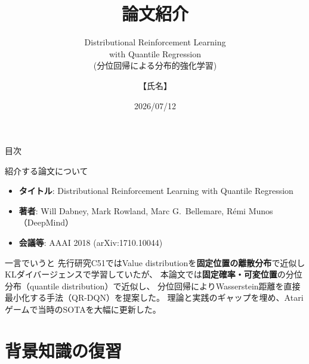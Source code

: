 \documentclass[aspectratio=169, dvipdfmx, 11pt]{beamer}
\title[論文紹介]{論文紹介}
\subtitle{Distributional Reinforcement Learning\\with Quantile Regression\\{\small (分位回帰による分布的強化学習)}}
\author{【氏名】}
\institute{【研究室名】 \quad 指導教員：【指導教員名】}
\date{2026/07/12}
\begin{document}
\maketitle

\begin{frame}{目次}
  \tableofcontents
\end{frame}

\begin{frame}{紹介する論文について}
  \begin{itemize}
    \item \textbf{タイトル}: Distributional Reinforcement Learning with Quantile Regression
    \item \textbf{著者}: Will Dabney, Mark Rowland, Marc G.\ Bellemare, Rémi Munos（DeepMind）
    \item \textbf{会議等}: AAAI 2018 (arXiv:1710.10044)
  \end{itemize}
  \vfill
  \begin{block}{一言でいうと}
    先行研究C51ではValue distributionを\textbf{固定位置の離散分布}で近似しKLダイバージェンスで学習していたが、
    本論文では\textbf{固定確率・可変位置}の\alert{分位分布}（quantile distribution）で近似し、
    \alert{分位回帰}によりWasserstein距離を直接最小化する手法（QR-DQN）を提案した。
    理論と実践のギャップを埋め、Atariゲームで当時のSOTAを大幅に更新した。
  \end{block}
\end{frame}

\section{背景知識の復習}
\end{document}
